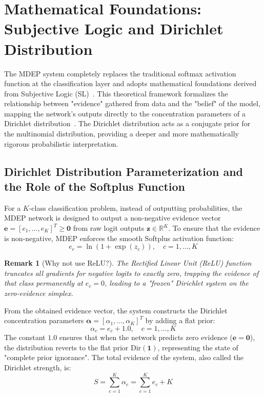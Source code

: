 \documentclass[11pt, a4paper]{article}
\newcommand{\Dir}{\text{Dir}}
\newcommand{\R}{\mathbb{R}}
\newtheorem{remark}{Remark}
\begin{document}
\section{Mathematical Foundations: Subjective Logic and Dirichlet Distribution}\label{sec:math}

The MDEP system completely replaces the traditional softmax activation function at the classification layer and adopts mathematical foundations derived from Subjective Logic (SL)~\cite{josang2016subjective}. This theoretical framework formalizes the relationship between "evidence" gathered from data and the "belief" of the model, mapping the network's outputs directly to the concentration parameters of a Dirichlet distribution~\cite{sensoy2018evidential}. The Dirichlet distribution acts as a conjugate prior for the multinomial distribution, providing a deeper and more mathematically rigorous probabilistic interpretation.

\subsection{Dirichlet Distribution Parameterization and the Role of the Softplus Function}

For a $K$-class classification problem, instead of outputting probabilities, the MDEP network is designed to output a non-negative evidence vector $\bm{e} = [e_1, \ldots, e_K]^T \ge \bm{0}$ from raw logit outputs $\bm{z} \in \R^K$. To ensure that the evidence is non-negative, MDEP enforces the smooth Softplus activation function:
\begin{equation}\label{eq:softplus}
    e_c = \ln(1 + \exp(z_c)), \quad c = 1, \ldots, K
\end{equation}

\begin{remark}[Why not use ReLU?]
The Rectified Linear Unit (ReLU) function truncates all gradients for negative logits to exactly zero, trapping the evidence of that class permanently at $e_c = 0$, leading to a "frozen" Dirichlet system on the zero-evidence simplex.
\end{remark}

From the obtained evidence vector, the system constructs the Dirichlet concentration parameters $\bm{\alpha} = [\alpha_1, \ldots, \alpha_K]^T$ by adding a flat prior:
\begin{equation}\label{eq:alpha}
    \alpha_c = e_c + 1.0, \quad c = 1, \ldots, K
\end{equation}
The constant $1.0$ ensures that when the network predicts zero evidence ($\bm{e} = \bm{0}$), the distribution reverts to the flat prior $\Dir(\bm{1})$, representing the state of "complete prior ignorance". The total evidence of the system, also called the Dirichlet strength, is:
\begin{equation}\label{eq:S}
    S = \sum_{c=1}^K \alpha_c = \sum_{c=1}^K e_c + K
\end{equation}
\end{document}
